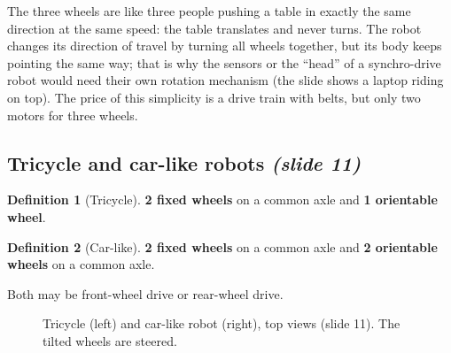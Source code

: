 \documentclass[11pt,a4paper]{article}
\theoremstyle{definition}
\newtheorem{definition}{Definition}[section]
\theoremstyle{plain}
\newcommand{\fixedwheel}[2]{\begin{scope}[shift={(#1)},rotate=#2]
  \draw[fill=gray!30] (-0.3,-0.07) rectangle (0.3,0.07);\end{scope}}
\newcommand{\orientwheel}[2]{\begin{scope}[shift={(#1)},rotate=#2]
  \draw[pattern=north east lines] (-0.3,-0.07) rectangle (0.3,0.07);
  \fill (0,0) circle (1pt);\end{scope}}
\begin{document}
\begin{intuition}
The three wheels are like three people pushing a table in exactly the same direction at the same speed: the table translates and never turns. The robot changes its direction of travel by turning all wheels together, but its body keeps pointing the same way; that is why the sensors or the ``head'' of a synchro-drive robot would need their own rotation mechanism (the slide shows a laptop riding on top). The price of this simplicity is a drive train with belts, but only two motors for three wheels.
\end{intuition}

\subsection{Tricycle and car-like robots \emph{(slide 11)}}

\begin{definition}[Tricycle]
\textbf{2 fixed wheels} on a common axle and \textbf{1 orientable wheel}.
\end{definition}
\begin{definition}[Car-like]
\textbf{2 fixed wheels} on a common axle and \textbf{2 orientable wheels} on a common axle.
\end{definition}
Both may be front-wheel drive or rear-wheel drive.

\begin{figure}[H]
\centering
{}
\caption{Tricycle (left) and car-like robot (right), top views (slide 11). The tilted wheels are steered.}
\end{figure}
\end{document}
